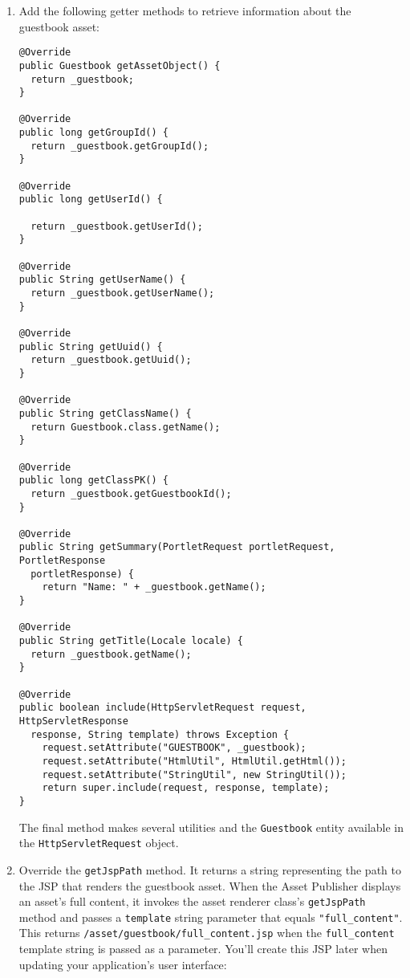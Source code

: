 \begin{enumerate}
\begin{verbatim}
    return false;
}

@Override
public boolean hasViewPermission(PermissionChecker permissionChecker) 
{
    try {
        return _guestbookModelResourcePermission.contains(
            permissionChecker, _guestbook, ActionKeys.VIEW);
    }
    catch (Exception e) {
    }

    return true;
}
\end{verbatim}
\item
  Add the following getter methods to retrieve information about the
  guestbook asset:

\begin{verbatim}
@Override
public Guestbook getAssetObject() {
  return _guestbook;
}

@Override
public long getGroupId() {
  return _guestbook.getGroupId();
}

@Override
public long getUserId() {

  return _guestbook.getUserId();
}

@Override
public String getUserName() {
  return _guestbook.getUserName();
}

@Override
public String getUuid() {
  return _guestbook.getUuid();
}

@Override
public String getClassName() {
  return Guestbook.class.getName();
}

@Override
public long getClassPK() {
  return _guestbook.getGuestbookId();
}

@Override
public String getSummary(PortletRequest portletRequest, PortletResponse 
  portletResponse) {
    return "Name: " + _guestbook.getName();
}

@Override
public String getTitle(Locale locale) {
  return _guestbook.getName();
}

@Override
public boolean include(HttpServletRequest request, HttpServletResponse 
  response, String template) throws Exception {
    request.setAttribute("GUESTBOOK", _guestbook);
    request.setAttribute("HtmlUtil", HtmlUtil.getHtml());
    request.setAttribute("StringUtil", new StringUtil());
    return super.include(request, response, template);
}
\end{verbatim}

  The final method makes several utilities and the \texttt{Guestbook}
  entity available in the \texttt{HttpServletRequest} object.
\item
  Override the \texttt{getJspPath} method. It returns a string
  representing the path to the JSP that renders the guestbook asset.
  When the Asset Publisher displays an asset's full content, it invokes
  the asset renderer class's \texttt{getJspPath} method and passes a
  \texttt{template} string parameter that equals
  \texttt{"full\_content"}. This returns
  \texttt{/asset/guestbook/full\_content.jsp} when the
  \texttt{full\_content} template string is passed as a parameter.
  You'll create this JSP later when updating your application's user
  interface:


\end{enumerate}
